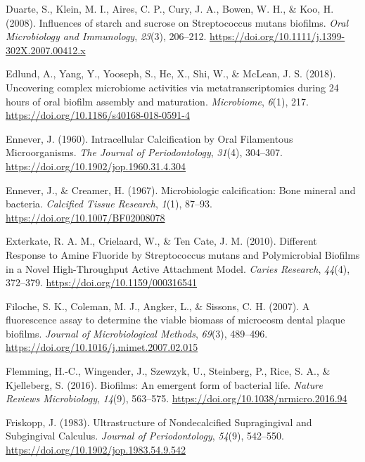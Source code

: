 \documentclass[
  letterpaper,
]{book}
\newlength{\cslhangindent}
\newlength{\cslentryspacingunit} %
\newenvironment{CSLReferences}[2] %
 {%
  \setlength{\parindent}{0pt}
  \ifodd #1
  \let\oldpar\par
  \def\par{\hangindent=\cslhangindent\oldpar}
  \fi
  \setlength{\parskip}{#2\cslentryspacingunit}
 }%
 {}
\begin{document}
\begin{CSLReferences}{1}{0}
\leavevmode{}%
Duarte, S., Klein, M. I., Aires, C. P., Cury, J. A., Bowen, W. H., \&
Koo, H. (2008). Influences of starch and sucrose on {Streptococcus}
mutans biofilms. \emph{Oral Microbiology and Immunology}, \emph{23}(3),
206--212. \url{https://doi.org/10.1111/j.1399-302X.2007.00412.x}

\leavevmode{}%
Edlund, A., Yang, Y., Yooseph, S., He, X., Shi, W., \& McLean, J. S.
(2018). Uncovering complex microbiome activities via metatranscriptomics
during 24 hours of oral biofilm assembly and maturation.
\emph{Microbiome}, \emph{6}(1), 217.
\url{https://doi.org/10.1186/s40168-018-0591-4}

\leavevmode{}%
Ennever, J. (1960). Intracellular {Calcification} by {Oral Filamentous
Microorganisms}. \emph{The Journal of Periodontology}, \emph{31}(4),
304--307. \url{https://doi.org/10.1902/jop.1960.31.4.304}

\leavevmode{}%
Ennever, J., \& Creamer, H. (1967). Microbiologic calcification: {Bone}
mineral and bacteria. \emph{Calcified Tissue Research}, \emph{1}(1),
87--93. \url{https://doi.org/10.1007/BF02008078}

\leavevmode{}%
Exterkate, R. A. M., Crielaard, W., \& Ten Cate, J. M. (2010). Different
{Response} to {Amine Fluoride} by {Streptococcus} mutans and
{Polymicrobial Biofilms} in a {Novel High-Throughput Active Attachment
Model}. \emph{Caries Research}, \emph{44}(4), 372--379.
\url{https://doi.org/10.1159/000316541}

\leavevmode{}%
Filoche, S. K., Coleman, M. J., Angker, L., \& Sissons, C. H. (2007). A
fluorescence assay to determine the viable biomass of microcosm dental
plaque biofilms. \emph{Journal of Microbiological Methods},
\emph{69}(3), 489--496.
\url{https://doi.org/10.1016/j.mimet.2007.02.015}

\leavevmode{}%
Flemming, H.-C., Wingender, J., Szewzyk, U., Steinberg, P., Rice, S. A.,
\& Kjelleberg, S. (2016). Biofilms: An emergent form of bacterial life.
\emph{Nature Reviews Microbiology}, \emph{14}(9), 563--575.
\url{https://doi.org/10.1038/nrmicro.2016.94}

\leavevmode{}%
Friskopp, J. (1983). Ultrastructure of {Nondecalcified Supragingival}
and {Subgingival Calculus}. \emph{Journal of Periodontology},
\emph{54}(9), 542--550. \url{https://doi.org/10.1902/jop.1983.54.9.542}


\end{CSLReferences}
\end{document}
